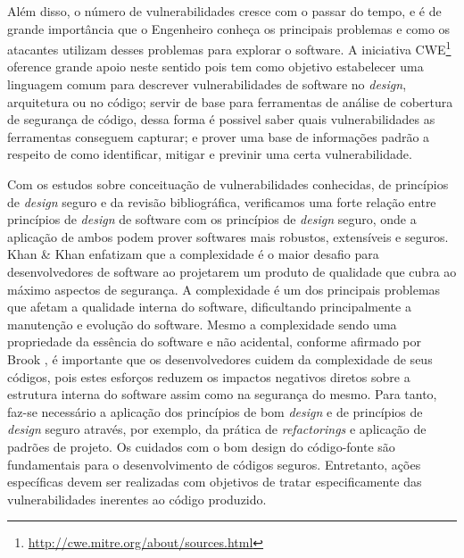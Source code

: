 Além disso, o número de vulnerabilidades cresce com o passar do tempo, e é de grande importância que o Engenheiro conheça os principais problemas e como os atacantes utilizam desses problemas para explorar o software. A iniciativa CWE\footnote{\url{http://cwe.mitre.org/about/sources.html}} oference grande apoio neste sentido pois tem como objetivo estabelecer uma linguagem comum para descrever vulnerabilidades de software no \emph{design}, arquitetura ou no código; servir de base para ferramentas de análise de cobertura de segurança de código, dessa forma é possivel saber quais vulnerabilidades as ferramentas conseguem capturar; e prover uma base de informações padrão a respeito de como identificar, mitigar e previnir uma certa vulnerabilidade.


Com os estudos sobre conceituação de vulnerabilidades conhecidas, de princípios de \emph{design} seguro e da revisão bibliográfica, verificamos uma forte relação entre princípios de \emph{design} de software com os princípios de \emph{design} seguro, onde a aplicação de ambos podem prover softwares mais robustos, extensíveis e seguros. 
%
Khan \& Khan \cite{khan2010} enfatizam que a complexidade é o maior desafio para desenvolvedores de software ao projetarem um produto de qualidade que cubra ao máximo aspectos de segurança. A complexidade é um dos principais problemas que afetam a qualidade interna do software, dificultando principalmente a manutenção e evolução do software.
%
Mesmo a complexidade sendo uma propriedade da essência do software e não acidental, conforme afirmado por Brook \cite{brooks1986}, é importante que os desenvolvedores cuidem da complexidade de seus códigos, pois estes esforços reduzem os impactos negativos diretos sobre a estrutura interna do software assim como na segurança do mesmo. Para tanto, faz-se necessário a aplicação dos princípios de bom \emph{design} e de princípios de \emph{design} seguro através, por exemplo, da prática de \emph{refactorings} e aplicação de padrões de projeto.
%
Os cuidados com o bom design do código-fonte são fundamentais para o desenvolvimento de códigos seguros. Entretanto, ações específicas devem ser realizadas com objetivos de tratar especificamente das vulnerabilidades inerentes ao código produzido.


